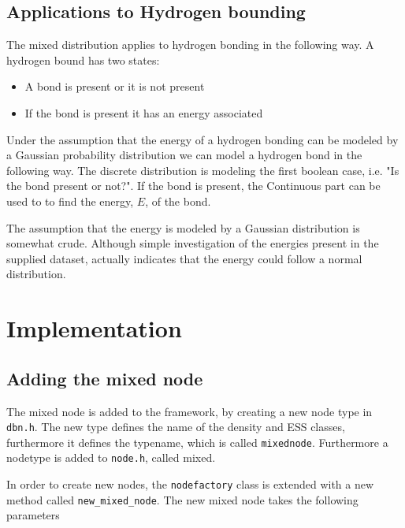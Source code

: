 \documentclass[10pt, journal, compsocconf,a4paper]{IEEEtran}
\begin{document}

\subsection{Applications to Hydrogen bounding} %
\label{sub:applications_to_hydrogen_bounding}
The mixed distribution applies to hydrogen bonding in the following way. A hydrogen bound has two states:

\begin{itemize}
  \item A bond is present or it is not present
  \item If the bond is present it has an energy associated
\end{itemize}

Under the assumption that the energy of a hydrogen bonding can be modeled by a Gaussian probability distribution we can model a hydrogen bond in the following way. The discrete distribution is modeling the first boolean case, i.e. "Is the bond present or not?". If the bond is present, the Continuous part can be used to to find the energy, $E$, of the bond.

The assumption that the energy is modeled by a Gaussian distribution is somewhat crude. Although simple investigation of the energies present in the supplied dataset, actually indicates that the energy could follow a normal distribution.




\section{Implementation} %
\label{sec:implementation}

\subsection{Adding the mixed node} %
\label{sub:adding_the_mixed_node}
The mixed node is added to the framework, by creating a new node type in \texttt{dbn.h}. The new type defines the name of the density and ESS classes, furthermore it defines the typename, which is called \texttt{mixednode}. Furthermore a nodetype is added to \texttt{node.h}, called mixed.

In order to create new nodes, the \texttt{nodefactory} class is extended with a new method called \texttt{new\_mixed\_node}. The new mixed node takes the following parameters
\end{document}
